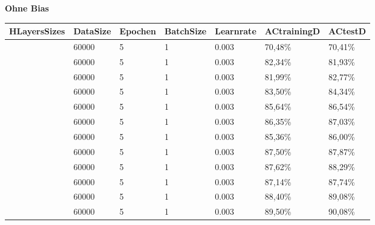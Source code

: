\documentclass[12pt]{article}
\begin{document}
\begin{table}[H]
    \centering
    \textbf{Ohne Bias}
    \begin{tabular}{|l|l|l|l|l|l|l|}
    \hline
        HLayersSizes & DataSize & Epochen & BatchSize & Learnrate & ACtrainingD & ACtestD \\ \hline
        [784, 10, 10] & 60000 & 5 & 1 & 0.003 & 70,48\% & 70,41\% \\ \hline
        [784, 20, 10] & 60000 & 5 & 1 & 0.003 & 82,34\% & 81,93\% \\ \hline
        [784, 30, 10] & 60000 & 5 & 1 & 0.003 & 81,99\% & 82,77\% \\ \hline
        [784, 40, 10] & 60000 & 5 & 1 & 0.003 & 83,50\% & 84,34\% \\ \hline
        [784, 50, 10] & 60000 & 5 & 1 & 0.003 & 85,64\% & 86,54\% \\ \hline
        [784, 60, 10] & 60000 & 5 & 1 & 0.003 & 86,35\% & 87,03\% \\ \hline
        [784, 70, 10] & 60000 & 5 & 1 & 0.003 & 85,36\% & 86,00\% \\ \hline
        [784, 80, 10] & 60000 & 5 & 1 & 0.003 & 87,50\% & 87,87\% \\ \hline
        [784, 90, 10] & 60000 & 5 & 1 & 0.003 & 87,62\% & 88,29\% \\ \hline
        [784, 100, 10] & 60000 & 5 & 1 & 0.003 & 87,14\% & 87,74\% \\ \hline
        [784, 150, 10] & 60000 & 5 & 1 & 0.003 & 88,40\% & 89,08\% \\ \hline
        [784, 200, 10] & 60000 & 5 & 1 & 0.003 & 89,50\% & 90,08\% \\ \hline
    \end{tabular}
\end{table}
\end{document}
